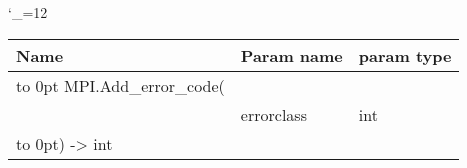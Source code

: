 \begingroup \catcode`\_=12 \tt
\begin{tabular}{lll}
\toprule
\textrm{Name}&\textrm{Param name}&\textrm{param type}\\
\midrule
\hbox to 0pt {MPI.Add_error_code(\hss}\\
& errorclass & int\\
\hbox to 0pt{) -> int\hss}\\
\bottomrule
\end{tabular}
\endgroup

